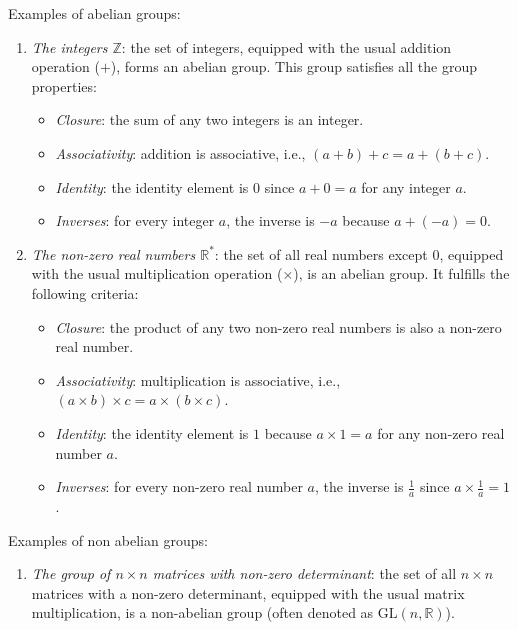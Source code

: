 \begin{example}
    Examples of abelian groups:
    \begin{enumerate}
        \item \textit{The integers $\mathbb{Z}$}: the set of integers, equipped with the usual addition operation ($+$), forms an abelian group.
            This group satisfies all the group properties:
            \begin{itemize}
                \item \textit{Closure}: the sum of any two integers is an integer.
                \item \textit{Associativity}: addition is associative, i.e., $(a + b) + c = a + (b + c)$.
                \item \textit{Identity}: the identity element is $0$ since $a + 0 = a$ for any integer $a$.
                \item \textit{Inverses}: for every integer $a$, the inverse is $-a$ because $a + (-a) = 0$.
            \end{itemize}
        \item \textit{The non-zero real numbers $\mathbb{R}^*$}: the set of all real numbers except $0$, equipped with the usual multiplication operation ($\times$), is an abelian group. 
            It fulfills the following criteria:
            \begin{itemize}
                \item \textit{Closure}: the product of any two non-zero real numbers is also a non-zero real number.
                \item \textit{Associativity}: multiplication is associative, i.e., $(a \times b) \times c = a \times (b \times c)$.
                \item \textit{Identity}: the identity element is $1$ because $a \times 1 = a$ for any non-zero real number $a$.
                \item \textit{Inverses}: for every non-zero real number $a$, the inverse is $\frac{1}{a}$ since $a \times \frac{1}{a} = 1$.
            \end{itemize}
    \end{enumerate}
    Examples of non abelian groups: 
    \begin{enumerate}
        \item \textit{The group of $n \times n$ matrices with non-zero determinant}: the set of all $n \times n$ matrices with a non-zero determinant, equipped with the usual matrix multiplication, is a non-abelian group (often denoted as $\text{GL}(n, \mathbb{R})$). 

\end{enumerate}
\end{example}
